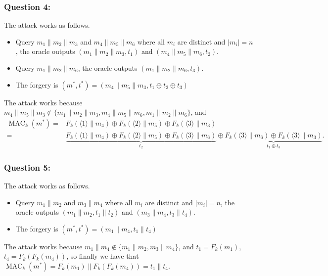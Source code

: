 \documentclass{article}
\numberwithin{defn}{section}
\numberwithin{equation}{section}
\newcommand{\MAC}{\operatorname{MAC}}
\begin{document}
\subsubsection*{Question 4:}
The attack works as follows. 
\begin{itemize}
\item Query $m_1\|m_2\|m_3$ and $m_4\|m_5\|m_6$ where all $m_i$ are distinct and $|m_i|=n$, the oracle outputs $( m_1\|m_2\|m_3,t_1)$ and $( m_4\|m_5\|m_6,t_2)$.
\item Query $m_1\|m_2\|m_6$, the oracle outputs $(m_1\|m_2\|m_6,t_3)$.
\item The forgery is $(m^*,t^*)=( m_4\|m_5\|m_3,t_1\oplus t_2\oplus t_3 )$
\end{itemize}	
The attack works because $m_4\|m_5\|m_3\not\in \{m_1\|m_2\|m_3, m_4\|m_5\|m_6,m_1\|m_2\|m_6 \}$, and
\begin{align*}
\MAC_k(m^*)=&F_k(\langle 1\rangle \|m_4)\oplus F_k(\langle 2\rangle \|m_5)\oplus F_k(\langle 3\rangle \|m_3)\\
=& \underset{t_2}{\underbrace{F_k(\langle 1\rangle \|m_4)\oplus F_k(\langle 2\rangle \|m_5)\oplus F_k(\langle 3\rangle \|m_6)}} \oplus \underset{t_1\oplus t_3}{\underbrace{F_k(\langle 3\rangle \|m_6)\oplus F_k(\langle 3\rangle \|m_3)}}.
\end{align*}

\subsubsection*{Question 5:}
The attack works as follows. 
\begin{itemize}
\item Query $m_1\|m_2$ and $m_3\|m_4$ where all $m_i$ are distinct and $|m_i|=n$, the oracle outputs $( m_1\|m_2,t_1\| t_2)$ and $( m_3\|m_4 ,t_3\|t_4)$.
\item The forgery is $(m^*,t^*)=( m_1\|m_4,t_1\| t_4 )$
\end{itemize}	
The attack works because $m_1\|m_4 \not\in \{m_1\|m_2, m_3\|m_4 \}$, and $t_1=F_k(m_1)$, $t_4=F_k(F_k(m_4))$, so finally we have that $\MAC_k(m^*)=F_k(m_1)\|  F_k(F_k(m_4))=t_1\|t_4$. 

\end{document}
